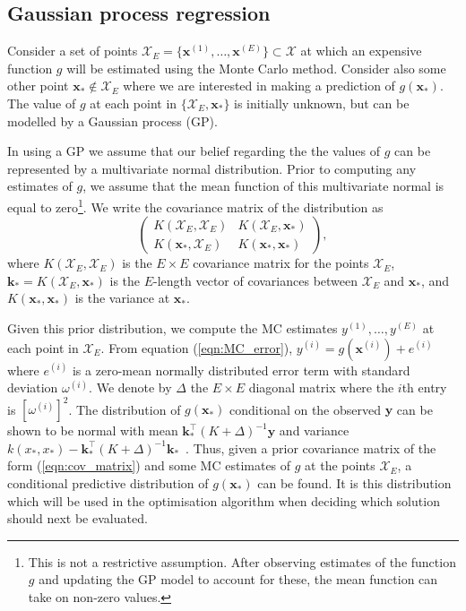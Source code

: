\documentclass{article} %
\begin{document}
\subsection{Gaussian process regression}\label{sec:GP}

Consider a set of points $\mathcal{X}_{E} = \{ \textbf{x}^{(1)}, \ldots , \textbf{x}^{(E)} \} \subset \mathcal{X}$ at which an expensive function $g$ will be estimated using the Monte Carlo method. Consider also some other point $\mathbf{x}_{*} \not\in \mathcal{X}_{E}$ where we are interested in making a prediction of $g(\mathbf{x}_{*})$. The value of $g$ at each point in $\{\mathcal{X}_{E}, \mathbf{x}_{*}\}$ is initially unknown, but can be modelled by a Gaussian process (GP). 

In using a GP we assume that our belief regarding the the values of $g$ can be represented by a multivariate normal distribution. Prior to computing any estimates of $g$, we assume that the mean function of this multivariate normal is equal to zero\footnote{This is not a restrictive assumption. After observing estimates of the function $g$ and updating the GP model to account for these, the mean function can take on non-zero values.}. We write the covariance matrix of the distribution as
\begin{equation}\label{eqn:cov_matrix}
\begin{pmatrix}
K(\mathcal{X}_{E}, \mathcal{X}_{E}) & K(\mathcal{X}_{E}, \mathbf{x}_{*}) \\
K(\mathbf{x}_{*}, \mathcal{X}_{E}) & K(\mathbf{x}_{*}, \mathbf{x}_{*})
\end{pmatrix},
\end{equation}
where $K(\mathcal{X}_{E}, \mathcal{X}_{E})$ is the $E \times E$ covariance matrix for the points $\mathcal{X}_{E}$, $\mathbf{k}_{*} = K(\mathcal{X}_{E}, \mathbf{x}_{*})$ is the $E$-length vector of covariances between $\mathcal{X}_{E}$ and $\mathbf{x}_{*}$, and $K(\mathbf{x}_{*}, \mathbf{x}_{*})$ is the variance at $\mathbf{x}_{*}$.

Given this prior distribution, we compute the MC estimates $y^{(1)} , \ldots , y^{(E)}$ at each point in $\mathcal{X}_{E}$. From equation (\ref{eqn:MC_error}), $y^{(i)} = g(\textbf{x}^{(i)}) + e^{(i)}$ where $e^{(i)}$ is a zero-mean normally distributed error term with standard deviation $\omega^{(i)}$. We denote by $\Delta$ the $E \times E$ diagonal matrix where the $i$th entry is $[\omega^{(i)}]^{2}$. The distribution of $g(\mathbf{x}_{*})$ conditional on the observed $\mathbf{y}$ can be shown to be normal with mean $\mathbf{k}_{*}^\top(K + \Delta)^{-1}\mathbf{y}$ and variance $k(x_{*}, x_{*})-\mathbf{k}_{*}^\top(K + \Delta)^{-1}\mathbf{k}_{*}$~\cite{Rasmussen2006}. Thus, given a prior covariance matrix of the form (\ref{eqn:cov_matrix}) and some MC estimates of $g$ at the points $\mathcal{X}_{E}$, a conditional predictive distribution of $g(\mathbf{x}_{*})$ can be found. It is this distribution which will be used in the optimisation algorithm when deciding which solution should next be evaluated.
\end{document}
